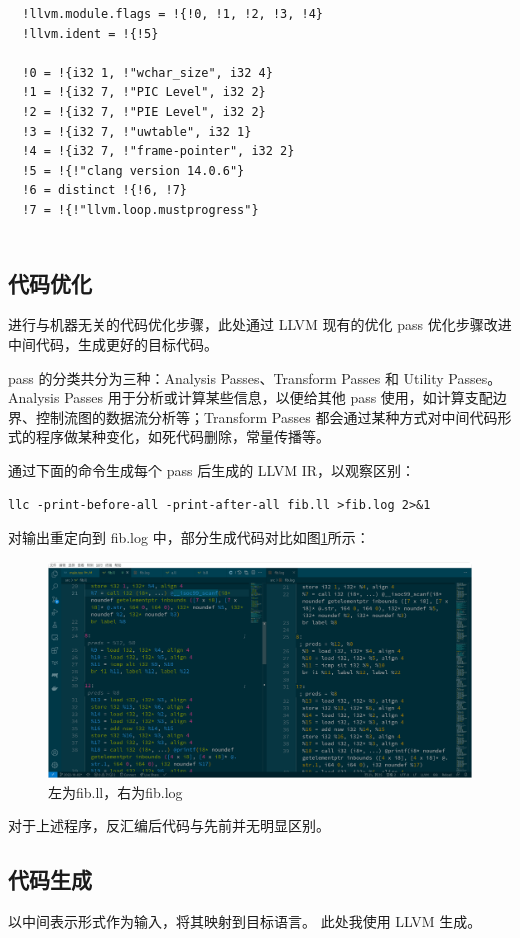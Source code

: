 \documentclass[UTF8,a4paper,10pt]{ctexart}
\begin{document}
\begin{verbatim}
  !llvm.module.flags = !{!0, !1, !2, !3, !4}
  !llvm.ident = !{!5}
  
  !0 = !{i32 1, !"wchar_size", i32 4}
  !1 = !{i32 7, !"PIC Level", i32 2}
  !2 = !{i32 7, !"PIE Level", i32 2}
  !3 = !{i32 7, !"uwtable", i32 1}
  !4 = !{i32 7, !"frame-pointer", i32 2}
  !5 = !{!"clang version 14.0.6"}
  !6 = distinct !{!6, !7}
  !7 = !{!"llvm.loop.mustprogress"}
  
\end{verbatim}

\subsection{代码优化}
进行与机器无关的代码优化步骤，此处通过 LLVM 现有的优化 pass 优化步骤改进中间代码，生成更好的目标代码。

pass 的分类共分为三种：Analysis Passes、Transform Passes 和 Utility Passes。Analysis Passes 用于分析或计算某些信息，以便给其他 pass 使用，如计算支配边界、控制流图的数据流分析等；Transform Passes 都会通过某种方式对中间代码形式的程序做某种变化，如死代码删除，常量传播等。

通过下面的命令生成每个 pass 后生成的 LLVM IR，以观察区别：

\verb|llc -print-before-all -print-after-all fib.ll >fib.log 2>&1|

对输出重定向到 fib.log 中，部分生成代码对比如图\ref{pic:3}所示：
\begin{figure}[H]
  \centering
  \includegraphics[width=\textwidth]{figure/diff.png}
  \caption{左为fib.ll，右为fib.log}
  \label{pic:3}
\end{figure}

对于上述程序，反汇编后代码与先前并无明显区别。

\subsection{代码生成}
以中间表示形式作为输入，将其映射到目标语言。
此处我使用 LLVM 生成。
\end{document}
